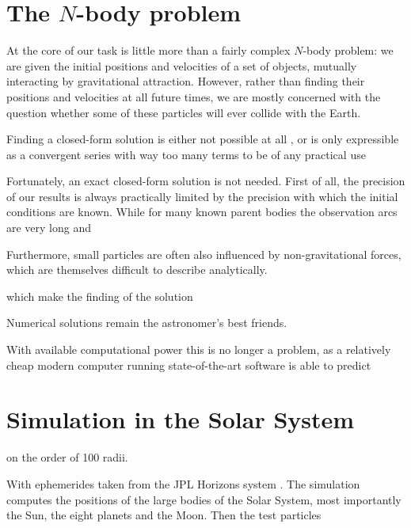 


\section{The $N$-body problem} \label{mN}
    At the core of our task is little more than a fairly complex $N$-body problem: we are given
    the initial positions and velocities of a set of objects, mutually interacting by gravitational attraction.
    However, rather than finding their positions and velocities at all future times, we are mostly concerned
    with the question whether some of these particles will ever collide with the Earth.

    Finding a closed-form solution is either not possible at all \cite{...}, or is only expressible
    as a convergent series with way too many terms to be of any practical use \cite{beloriszky-1930}

    Fortunately, an exact closed-form solution is not needed. First of all, the precision of our results
    is always practically limited by the precision with which the initial conditions are known.
    While for many known parent bodies the observation arcs are very long and 

    Furthermore, small particles are often also influenced by non-gravitational forces,
    which are themselves difficult to describe analytically.

    which make the finding of the solution 

    Numerical solutions remain the astronomer's best friends.

    With available computational power this is no longer a problem, as a relatively cheap modern computer
    running state-of-the-art software is able to predict

\section{Simulation in the Solar System} \label{as}
    on the order of 100 radii.

    With ephemerides taken from the JPL Horizons system \citep{...}.
    The simulation computes the positions of the large bodies of the Solar System, most importantly the Sun,
    the eight planets and the Moon. Then the test particles

